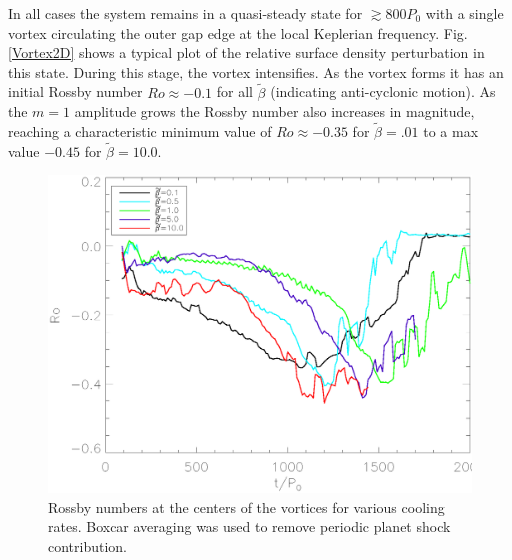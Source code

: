 In all cases the system remains in a quasi-steady state for
$\gtrsim800P_0$ with a single vortex circulating 
the outer gap edge at the local Keplerian  
frequency. Fig. \ref{Vortex2D} shows a typical plot of the relative 
surface density perturbation in this state. During this stage, the 
vortex intensifies. As the vortex forms it has an initial 
Rossby number $Ro\approx-0.1$ for all $\tilde\beta$
(indicating anti-cyclonic 
motion). As the $m=1$ amplitude grows the Rossby number also increases
in magnitude, 
 reaching a characteristic minimum value of $Ro\approx-0.35$ for
 $\tilde\beta=.01$ to a max value $-0.45$ for $\tilde\beta=10.0$. 

\begin{figure}
  \includegraphics[width=\linewidth,clip=true,trim=0.5cm
  0cm 0cm 1cm]{figures/rossby}
  \caption{Rossby numbers at the centers of the vortices for various
 cooling rates. Boxcar averaging was used to remove periodic planet shock contribution.\label{rossbyplot}}   
\end{figure}

